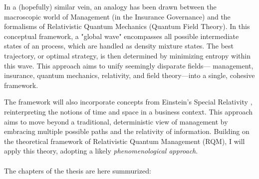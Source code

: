 \documentclass{article}
\begin{document}
In a (hopefully) similar vein, an analogy has been drawn between the macroscopic world of Management (in the Insurance Governance) and the formalisms of Relativistic Quantum Mechanics (Quantum Field Theory). In this conceptual framework, a "global wave" encompasses all possible intermediate states of an process, which are handled as density mixture states. The best trajectory, or optimal strategy, is then determined by minimizing entropy within this wave. This approach aims to unify seemingly disparate fields— management, insurance, quantum mechanics, relativity, and field theory—into a single, cohesive framework. 

 The framework will also incorporate concepts from Einstein's Special Relativity \cite{einstein1905elektrodynamik}, reinterpreting the notions of time and space in a business context. This approach aims to move beyond a traditional, deterministic view of management by embracing multiple possible paths and the relativity of information. Building on the theoretical framework of Relativistic Quantum Management (RQM), I will apply this theory, adopting a likely \textit{phenomenological approach}.\\\\
 The chapters of the thesis are here summurized:\\
\end{document}

